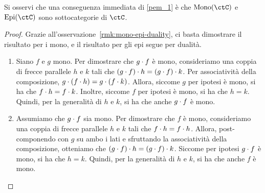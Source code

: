 Si osservi che una conseguenza immediata di \ref{pem_1} è che \(\Mono[\ctC]\) e \(\Epi[\ctC]\) sono sottocategorie di \(\ctC\).
\begin{proof}
 Grazie all'osservazione~\ref{rmk:mono-epi-duality},	ci basta dimostrare il risultato per i mono,	e il risultato per gli epi segue per dualità.
 \begin{enumerate}
  \item Siano \(f\) e \(g\) mono. Per dimostrare che \(g \cdot f\) è mono, consideriamo una coppia di frecce parallele \(h\) e \(k\) tali che \((g \cdot f) \cdot h = (g \cdot f) \cdot k\). Per associatività della composizione, \(g \cdot (f \cdot h) = g \cdot (f \cdot k)\). Allora, siccome \(g\) per ipotesi è mono, si ha che \(f \cdot h = f \cdot k\). Inoltre, siccome \(f\) per ipotesi è mono, si ha che \(h = k\). Quindi, per la generalità di \(h\) e \(k\), si ha che anche \(g \cdot f\) è mono.
  \item Assumiamo che \(g \cdot f\) sia mono. Per dimostrare che \(f\) è mono, consideriamo una coppia di frecce parallele \(h\) e \(k\) tali che \(f \cdot h = f \cdot h\). Allora, post-componendo con \(g\) su ambo i lati e sfruttando la associatività della composizione, otteniamo che \((g \cdot f) \cdot h = (g \cdot f) \cdot k\). Siccome per ipotesi \(g \cdot f\) è mono, si ha che \(h = k\). Quindi, per la generalità di \(h\) e \(k\), si ha che anche \(f\) è mono. \qedhere
 \end{enumerate}
\end{proof}

